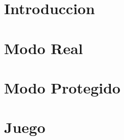 \documentclass[a4paper,10pt, nofootinbib]{article}
\begin{document}
\maketitle

\tableofcontents
\clearpage

\thispagestyle{empty}


\clearpage

\section{Introduccion}

\clearpage

\section{Modo Real}

\clearpage

\section{Modo Protegido}

\clearpage

\section{Juego}

\clearpage
\end{document}
